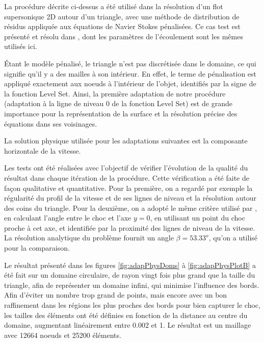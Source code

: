\indent La procédure décrite ci-dessus a été utilisé dans la résolution d'un flot supersonique 2D autour d'un triangle, avec une méthode de distribution de résidus appliquée aux équations de Navier Stokes pénalisées. Ce cas test est présenté et résolu dans \cite{leo}, dont les paramètres de l'écoulement sont les mêmes utilisés ici.

\indent Étant le modèle pénalisé, le triangle n'est pas discrétisée dans le domaine, ce qui signifie qu'il y a des mailles à son intérieur. En effet, le terme de pénalisation est appliqué exactement aux noeuds à l'intérieur de l'objet, identifiés par la signe de la fonction Level Set. Ainsi, la première adaptation de notre procédure (adaptation à la ligne de niveau 0 de la fonction Level Set) est de grande importance pour la représentation de la surface et la résolution précise des équations dans ses voisinages.

\indent La solution physique utilisée pour les adaptations suivantes est la composante horizontale de la vitesse. 

\indent Les tests ont été réalisées avec l'objectif de vérifier l'évolution de la qualité du résultat dans chaque itération de la procédure. Cette vérification a été faite de façon qualitative et quantitative. Pour la première, on a regardé par exemple la régularité du profil de la vitesse et de ses lignes de niveau et la résolution autour des coins du triangle. Pour la deuxième, on a adopté le même critère utilisé par \cite{leo}, en calculant l'angle entre le choc et l'axe \(y=0\), en utilisant un point du choc proche à cet axe, et identifiée par la proximité des lignes de niveau de la vitesse. La résolution analytique du problème fournit un angle \(\beta=53.33^o\), qu'on a utilisé pour la comparaison.

\indent Le résultat présenté dans les figures \ref{fig:adapPhysDoms} à \ref{fig:adapPhysPlotB} a été fait sur un domaine circulaire, de rayon vingt fois plus grand que la taille du triangle, afin de représenter un domaine infini, qui minimise l'influence des bords. Afin d'éviter un nombre trop grand de points, mais encore avec un bon raffinement dans les régions les plus proches des bords pour bien capturer le choc, les tailles des éléments ont été définies en fonction de la distance au centre du domaine, augmentant linéairement entre 0.002 et 1. Le résultat est un maillage avec 12664 noeuds et 25200 éléments.

\indent

